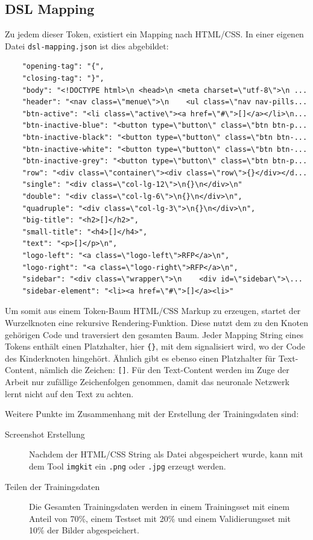 \documentclass[pdftex,a4paper,halfparskip, article]{scrartcl}
\begin{document}
\subsection{DSL Mapping}

Zu jedem dieser Token, existiert ein Mapping nach HTML/CSS. In einer eigenen Datei \texttt{dsl-mapping.json} ist dies abgebildet:

\begin{verbatim}
    "opening-tag": "{",
    "closing-tag": "}",
    "body": "<!DOCTYPE html>\n <head>\n <meta charset=\"utf-8\">\n ...
    "header": "<nav class=\"menue\">\n    <ul class=\"nav nav-pills...
    "btn-active": "<li class=\"active\"><a href=\"#\">[]</a></li>\n...
    "btn-inactive-blue": "<button type=\"button\" class=\"btn btn-p...
    "btn-inactive-black": "<button type=\"button\" class=\"btn btn-...
    "btn-inactive-white": "<button type=\"button\" class=\"btn btn-...
    "btn-inactive-grey": "<button type=\"button\" class=\"btn btn-p...
    "row": "<div class=\"container\"><div class=\"row\">{}</div></d...
    "single": "<div class=\"col-lg-12\">\n{}\n</div>\n"
    "double": "<div class=\"col-lg-6\">\n{}\n</div>\n",
    "quadruple": "<div class=\"col-lg-3\">\n{}\n</div>\n",
    "big-title": "<h2>[]</h2>",
    "small-title": "<h4>[]</h4>",
    "text": "<p>[]</p>\n",
    "logo-left": "<a class=\"logo-left\">RFP</a>\n",
    "logo-right": "<a class=\"logo-right\">RFP</a>\n",
    "sidebar": "<div class=\"wrapper\">\n    <div id=\"sidebar\">\...
    "sidebar-element": "<li><a href=\"#\">[]</a><li>"  
\end{verbatim}

Um somit aus einem Token-Baum HTML/CSS Markup zu erzeugen, startet der Wurzelknoten eine rekursive Rendering-Funktion. Diese nutzt dem zu den Knoten gehörigen Code und traversiert den gesamten Baum. Jeder Mapping String eines Tokens enthält einen Platzhalter, hier \texttt{\{\}}, mit dem signalisiert wird, wo der Code des Kinderknoten hingehört. Ähnlich gibt es ebenso einen Platzhalter für Text-Content, nämlich die Zeichen: \texttt{[]}. 
Für den Text-Content werden im Zuge der Arbeit nur zufällige Zeichenfolgen genommen, damit das neuronale Netzwerk lernt nicht auf den Text zu achten. 

Weitere Punkte im Zusammenhang mit der Erstellung der Trainingsdaten sind:

\begin{description}
	\item[Screenshot Erstellung] Nachdem der HTML/CSS String als Datei abgespeichert wurde, kann mit dem Tool \texttt{imgkit} ein \texttt{.png} oder \texttt{.jpg} erzeugt werden.
	\item[Teilen der Trainingsdaten] Die Gesamten Trainingsdaten werden in einem Trainingsset mit einem Anteil von 70\%, einem Testset mit 20\% und einem Validierungsset mit 10\% der Bilder abgespeichert.
\end{description}
\end{document}
